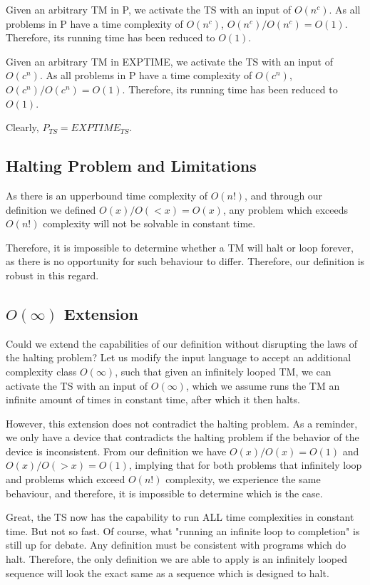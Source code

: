 \documentclass{report}
\begin{document}
Given an arbitrary TM in P, we activate the TS with an input of $O(n^c)$. As all problems in P have a time complexity of $O(n^c)$, $O(n^c)/O(n^c) = O(1)$. Therefore, its running time has been reduced to $O(1)$.

Given an arbitrary TM in EXPTIME, we activate the TS with an input of $O(c^n)$. As all problems in P have a time complexity of $O(c^n)$, $O(c^n)/O(c^n) = O(1)$. Therefore, its running time has been reduced to $O(1)$.

Clearly, $P_{TS} = EXPTIME_{TS}$.

\subsection{Halting Problem and Limitations}

As there is an upperbound time complexity of $O(n!)$, and through our definition we defined $O(x)/O(<x) = O(x)$, any problem which exceeds $O(n!)$ complexity will not be solvable in constant time.

Therefore, it is impossible to determine whether a TM will halt or loop forever, as there is no opportunity for such behaviour to differ. Therefore, our definition is robust in this regard.

\subsection{$O(\infty)$ Extension}

Could we extend the capabilities of our definition without disrupting the laws of the halting problem? Let us modify the input language to accept an additional complexity class $O(\infty)$, such that given an infinitely looped TM, we can activate the TS with an input of $O(\infty)$, which we assume runs the TM an infinite amount of times in constant time, after which it then halts.

However, this extension does not contradict the halting problem. As a reminder, we only have a device that contradicts the halting problem if the behavior of the device is inconsistent. From our definition we have $O(x)/O(x) = O(1)$ and $O(x)/O(>x) = O(1)$, implying that for both problems that infinitely loop and problems which exceed $O(n!)$ complexity, we experience the same behaviour, and therefore, it is impossible to determine which is the case.

Great, the TS now has the capability to run ALL time complexities in constant time. But not so fast. Of course, what "running an infinite loop to completion" is still up for debate. Any definition must be consistent with programs which do halt. Therefore, the only definition we are able to apply is an infinitely looped sequence will look the exact same as a sequence which is designed to halt.
\end{document}
